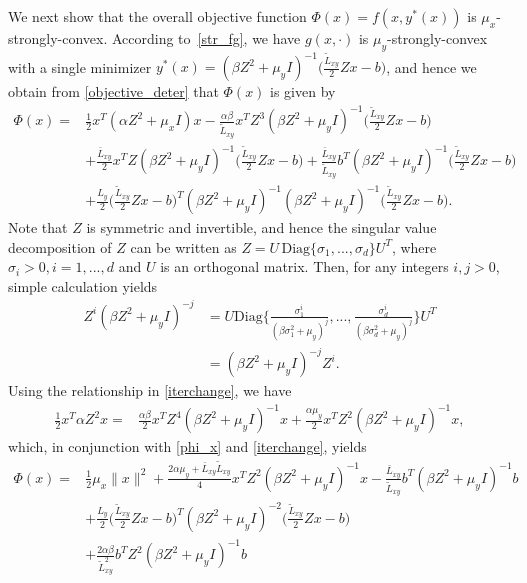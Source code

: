 \documentclass{osudissert96}
\begin{document}
We next show that the overall objective function $\Phi(x)=f(x,y^*(x)) $ is $\mu_x$-strongly-convex. 
According to~\cref{str_fg}, we have $g(x,\cdot)$ is $\mu_y$-strongly-convex with a single minimizer 
$y^*(x) = (\beta Z^2+\mu_y I)^{-1} \big(\frac{\widetilde L_{xy}}{2}Zx-b\big)$,
and hence we obtain from \cref{objective_deter} that $\Phi(x)$ is given by 
\begin{align}\label{phi_x}
\Phi(x) = &\frac{1}{2} x^T(\alpha Z^2 +\mu_x I) x -\frac{\alpha\beta}{\widetilde L_{xy}}x^TZ^3(\beta Z^2+\mu_y I)^{-1} \Big(\frac{\widetilde L_{xy}}{2}Zx-b\Big) \nonumber
\\ &+\frac{\bar L_{xy}}{2}x^TZ(\beta Z^2+\mu_y I)^{-1} \Big(\frac{\widetilde L_{xy}}{2}Zx-b\Big) + \frac{\bar L_{xy}}{\widetilde L_{xy}} b^T (\beta Z^2+\mu_y I)^{-1} \Big(\frac{\widetilde L_{xy}}{2}Zx-b\Big) \nonumber
\\&+ \frac{L_y}{2} \Big(\frac{\widetilde L_{xy}}{2}Zx-b\Big)^T (\beta Z^2+\mu_y I)^{-1}(\beta Z^2+\mu_y I)^{-1} \Big(\frac{\widetilde L_{xy}}{2}Zx-b\Big).  
\end{align}
Note that $Z$ is symmetric and invertible, and hence the singular value decomposition of $Z$ can be written as $Z= U \,\text{Diag}\{\sigma_1,...,\sigma_d\}U^T$, where $\sigma_i>0, i=1,...,d$ and $U$ is an orthogonal matrix. Then, for any integers $i,j>0$, simple calculation yields
\begin{align}\label{iterchange}
Z^i (\beta Z^2+\mu_y I)^{-j} &= U \text{Diag}\bigg\{\frac{\sigma^i_1}{(\beta \sigma_1^2+\mu_y)^j},...,\frac{\sigma^i_d}{(\beta \sigma_d^2+\mu_y)^j}\bigg\}U^T \nonumber
\\&= (\beta Z^2+\mu_y I)^{-j} Z^i. 
\end{align}
Using the relationship in \cref{iterchange}, we have  %
\begin{align*}
\frac{1}{2} x^T\alpha Z^2 x =& \frac{\alpha\beta}{2} x^T Z^4 (\beta Z^2+\mu_y I)^{-1} x + \frac{\alpha \mu_y}{2}x^TZ^2(\beta Z^2+\mu_y I)^{-1}x,
\end{align*}
which, in conjunction with  \cref{phi_x} and \cref{iterchange}, yields
\begin{align}
\Phi(x) = & \frac{1}{2} \mu_x \|x\|^2 + \frac{2\alpha\mu_y+\bar L_{xy}\widetilde L_{xy}}{4} x^T Z^2 (\beta Z^2+\mu_y I)^{-1} x - \frac{\bar L_{xy}}{\widetilde L_{xy}} b^T(\beta Z^2+\mu_y I)^{-1} b
 \nonumber
\\&+ \frac{L_y}{2} \Big(\frac{\widetilde L_{xy}}{2}Zx-b\Big)^T (\beta Z^2+\mu_y I)^{-2}\Big(\frac{\widetilde L_{xy}}{2}Zx-b\Big) \nonumber
\\&+ \frac{2\alpha\beta}{\widetilde L_{xy}^2}b^TZ^2 (\beta Z^2+\mu_y I)^{-1} b 
\end{align}
\end{document}
